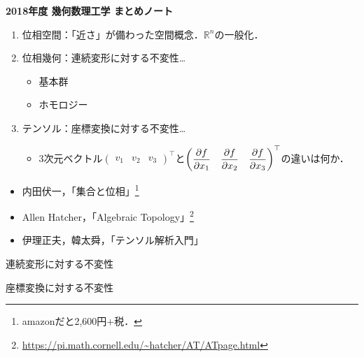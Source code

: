 \documentclass[uplatex]{jsarticle}
\begin{document}
\begin{center}{\LARGE \bf 2018年度 幾何数理工学 まとめノート}\end{center}

\sukima {}
\begin{enumerate}
    \vspace{-0.5\baselineskip}
    \item 位相空間：「近さ」が備わった空間概念．$\mathbb{R}^{n}$の一般化．
    \item 位相幾何：連続変形に対する不変性…
    \begin{itemize}
        \item 基本群
        \item ホモロジー
    \end{itemize}
    \item テンソル：座標変換に対する不変性…
    \begin{itemize}
        \item 3次元ベクトル${\displaystyle \begin{pmatrix}
            v_{1} & v_{2} & v_{3} 
        \end{pmatrix}^{\top}}$と${\displaystyle \begin{pmatrix}
            \dfrac{\partial f}{\partial x_{1}} & \dfrac{\partial f}{\partial x_{2}} & \dfrac{\partial f}{\partial x_{3}}
        \end{pmatrix}^{\top}}$の違いは何か．
    \end{itemize}
\end{enumerate}

\begin{itemize}
    \vspace{-0.5\baselineskip}
    \item 内田伏一，「集合と位相」\footnote{amazonだと2,600円$+$税．}
    \item Allen Hatcher，「Algebraic Topology」\footnote{\url{https://pi.math.cornell.edu/~hatcher/AT/ATpage.html}}
    \item 伊理正夫，韓太舜，「テンソル解析入門」
\end{itemize}

\renewcommand{\baselinestretch}{0.1}
\tableofcontents
\renewcommand{\baselinestretch}{1.0}


連続変形に対する不変性


座標変換に対する不変性

\end{document}
